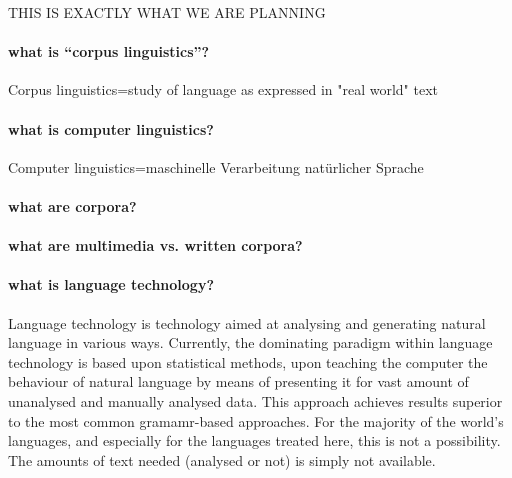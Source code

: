 \documentclass[a4paper,12pt]{article}
\begin{document}
THIS IS EXACTLY WHAT WE ARE PLANNING

\paragraph{what is “corpus linguistics”?} Corpus linguistics=study of language as expressed in "real world" text

\paragraph{what is computer linguistics?} Computer linguistics=maschinelle Verarbeitung natürlicher Sprache

\paragraph{what are corpora?}

\paragraph{what are multimedia vs. written corpora?}

\paragraph{what is language technology?}

Language technology is technology aimed at analysing and generating natural language in various ways. Currently, the dominating paradigm within language technology is based upon statistical methods, upon teaching the computer the behaviour of natural language by means of presenting it for vast amount of unanalysed and manually analysed data. This approach achieves results superior to the most common gramamr-based approaches. For the majority of the world's languages, and especially for the languages treated here, this is not a possibility. The amounts of text needed (analysed or not) is simply not available. 
\end{document}
